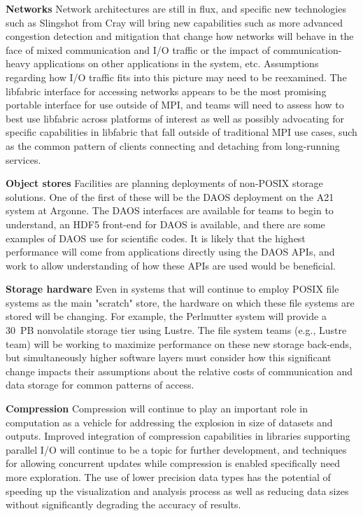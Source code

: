 \textbf{Networks} Network architectures are still in flux, and specific new technologies such as Slingshot from Cray will bring new capabilities such as more advanced congestion detection and mitigation that change how networks will behave in the face of mixed communication and I/O traffic or the impact of communication-heavy applications on other applications in the system, etc.  Assumptions regarding how I/O traffic fits into this picture may need to be reexamined. The libfabric interface for accessing networks appears to be the most promising portable interface for use outside of MPI, and teams will need to assess how to best use libfabric across platforms of interest as well as possibly advocating for specific capabilities in libfabric that fall outside of traditional MPI use cases, such as the common pattern of clients connecting and detaching from long-running services.

\textbf{Object stores} Facilities are planning deployments of non-POSIX storage solutions. One of the first of these will be the DAOS deployment on the A21 system at Argonne. The DAOS interfaces are available for teams to begin to understand, an HDF5 front-end for DAOS is available, and there are some examples of DAOS use for scientific codes. It is likely that the highest performance will come from applications directly using the DAOS APIs, and work to allow understanding of how these APIs are used would be beneficial.

\textbf{Storage hardware} Even in systems that will continue to employ POSIX file systems as the main "scratch" store, the hardware on which these file systems are stored will be changing. For example, the Perlmutter system will provide a 30~PB nonvolatile storage tier using Lustre. The file system teams (e.g., Lustre team) will be working to maximize performance on these new storage back-ends, but simultaneously higher software layers must consider how this significant change impacts their assumptions about the relative costs of communication and data storage for common patterns of access.

\textbf{Compression} Compression will continue to play an important role in computation as a vehicle for addressing the explosion in size of datasets and outputs. Improved integration of compression capabilities in libraries supporting parallel I/O will continue to be a topic for further development, and techniques for allowing concurrent updates while compression is enabled specifically need more exploration.  The use of lower precision data types has the potential of speeding up the visualization and analysis process as well as reducing data sizes without significantly degrading the accuracy of results. 

